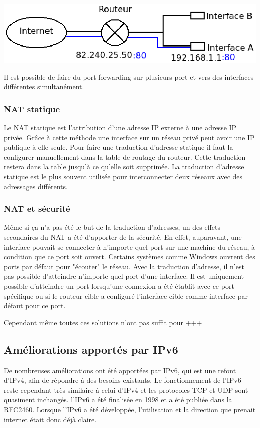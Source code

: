 \includegraphics{./pics/port_forwarding.eps}

Il est possible de faire du port forwarding sur plusieurs port et vers des
interfaces différentes simultanément.

\subsubsection{NAT statique}
Le NAT statique est l'attribution d'une adresse IP externe à une adresse IP 
privée. Grâce à cette méthode une interface sur un réseau privé peut avoir une
IP publique à elle seule. Pour faire une traduction d'adresse statique il faut la configurer
manuellement dans la table de routage du routeur. Cette traduction restera dans
la table jusqu'à ce qu'elle soit supprimée. La traduction d'adresse statique
est le plus souvent utilisée pour interconnecter deux réseaux avec des
adressages différents.

\subsubsection{NAT et sécurité}

Même si ça n'a pas été le but de la traduction d'adresses, un des effets
secondaires du NAT a été d'apporter de la sécurité. En effet, auparavant, une
interface pouvait se connecter à n'importe quel port sur une machine du réseau,
à condition que ce port soit ouvert. Certains systèmes comme Windows ouvrent des ports
par défaut pour "écouter" le réseau. Avec la traduction d'adresse, il n'est pas
possible d'atteindre n'importe quel port d'une interface. Il est uniquement
possible d'atteindre un port lorsqu'une connexion a été établit avec ce port
spécifique ou si le routeur cible a configuré l'interface cible comme interface
par défaut pour ce port.


Cependant même toutes ces solutions n'ont pas suffit pour +++

\subsection{Améliorations apportés par IPv6}

De nombreuses améliorations ont été apportées par IPv6, qui est une refont d'IPv4, afin de répondre à des besoins existants. Le fonctionnement de l'IPv6 reste cependant très similaire à celui d'IPv4 et 
les protocoles TCP et UDP sont quasiment inchangés.
l'IPv6 a été finalisée en 1998 et a été publiée dans la RFC2460. Lorsque l'IPv6 a été développée, 
l'utilisation et la direction que prenait internet était donc déjà claire. 

